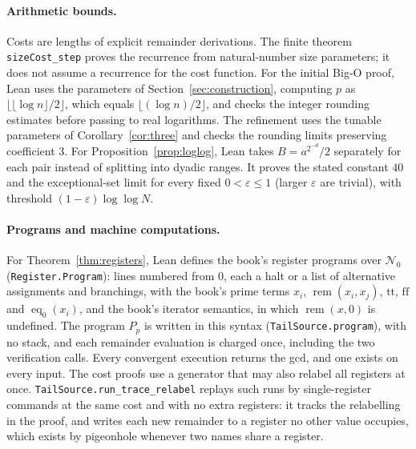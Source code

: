 \documentclass[11pt]{article}
\theoremstyle{remark}
\newcommand{\rem}{\operatorname{rem}}
\newcommand{\eq}{\operatorname{eq}}
\newcommand{\lean}[1]{\nolinkurl{#1}}
\begin{document}
\paragraph{Arithmetic bounds.}
Costs are lengths of explicit remainder derivations. The finite theorem
\lean{sizeCost_step} proves the recurrence from natural-number size
parameters; it does not assume a recurrence for the cost function.
For the initial Big-O proof, Lean uses the parameters of
Section~\ref{sec:construction}, computing $p$ as
$\lfloor\lfloor\log n\rfloor/2\rfloor$, which equals $\lfloor(\log n)/2\rfloor$,
and checks the integer rounding estimates before passing to real
logarithms. The refinement uses the
tunable parameters of Corollary~\ref{cor:three} and checks the rounding limits
preserving coefficient $3$.
For Proposition~\ref{prop:loglog}, Lean takes $B=a^{2^{-d}}/2$ separately
for each pair instead of splitting into dyadic ranges. It proves the
stated constant $40$ and the exceptional-set limit for every fixed
$0<\varepsilon\leq1$ (larger $\varepsilon$ are trivial), with threshold
$(1-\varepsilon)\log\log N$.

\paragraph{Programs and machine computations.}
For Theorem~\ref{thm:registers}, Lean defines the book's register programs
over $\mathcal N_0$ (\lean{Register.Program}): lines numbered from $0$, each
a halt or a list of alternative assignments and branchings, with the book's
prime terms $x_i$, $\rem(x_i,x_j)$, $\mathrm{tt}$, $\mathrm{ff}$ and
$\eq_0(x_i)$, and the book's iterator semantics, in which $\rem(x,0)$ is
undefined. The program $P_p$ is written in this syntax
(\lean{TailSource.program}), with no stack, and each remainder evaluation is
charged once, including the two verification calls. Every convergent
execution returns the gcd, and one exists on every input. The cost proofs use a generator that may also
relabel all registers at once. \lean{TailSource.run_trace_relabel} replays
such runs by single-register commands at the same cost and with no extra
registers: it tracks the relabelling in the proof, and writes each new
remainder to a register no other value occupies, which exists by
pigeonhole whenever two names share a register.
\end{document}
